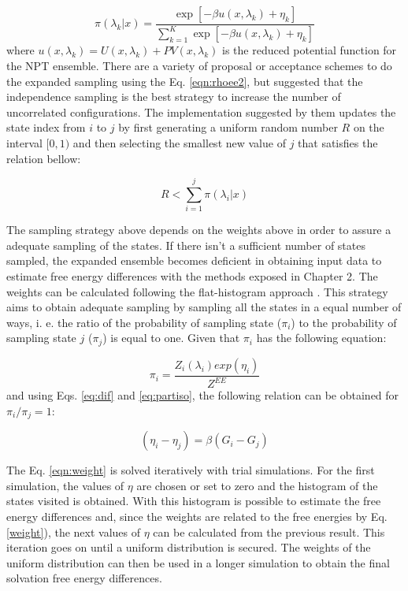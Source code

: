 \begin{equation}
\pi(\lambda_{k}|x) = \dfrac{\exp[-\beta u(x,\lambda_{k}) + \eta_{k}]}{ \sum_{k=1}^{K} \exp [- \beta u(x,\lambda_{k})+ \eta_{k}]}
\label{eqn:rhoee2}
\end{equation} 
where $u(x,\lambda_{k}) = U(x,\lambda_{k}) + PV(x,\lambda_{k})$ is the reduced potential function for the NPT ensemble. There are a variety of proposal or acceptance schemes to do the expanded sampling using the Eq. \eqref{eqn:rhoee2}, but  suggested that the independence sampling \cite{liu2002} is the best strategy to increase the number of uncorrelated configurations. The implementation suggested by them updates the state index from $i$ to $j$ by first generating a uniform random number $R$ on the interval $[0,1)$ and then selecting the smallest new value of $j$ that satisfies  the relation bellow:

\begin{equation}
R < \sum_{i=1}^{j} \pi(\lambda_{i}|x) 
\label{eqn:relee2}
\end{equation} 

The sampling strategy above depends on the weights above in order to assure a adequate sampling of the states. If there isn't a sufficient number of states sampled, the expanded ensemble becomes deficient in obtaining input data to estimate free energy differences with the methods exposed in Chapter 2. The weights can be calculated following the flat-histogram approach \cite{bernd1992,bernd1993,dayal2004}. This strategy aims to obtain adequate sampling by sampling all the states in a equal number of ways, i. e. the ratio of the probability of sampling state ($\pi_{i}$) to the probability of sampling state $j$ ($\pi_{j}$) is equal to one. Given that $\pi_{i}$ has the following equation:

\begin{equation}
\pi_{i} = \dfrac{Z_{i}(\lambda_{i}) exp(\eta_{i})}{Z^{EE}} 
\label{eqn:wei1}
\end{equation} 
and using Eqs. \ref{eq:dif} and \ref {eq:partiso}, the following relation can be obtained for $\pi_{i}/\pi_{j}=1$:

\begin{equation}
(\eta_{i} - \eta_{j}) = \beta(G_i-G_j)
\label{eqn:weight}
\end{equation}

The Eq. \eqref{eqn:weight} is solved iteratively with trial simulations. For the first simulation, the values of $\eta$ are chosen or set to zero and the histogram of the states visited is obtained. With this histogram is possible to estimate the free energy differences and, since the weights are related to the free energies by Eq. \eqref{weight}), the next values of $\eta$ can be calculated  from the previous result. This iteration goes on until a uniform distribution is secured. The weights of the uniform distribution can then  be used in a longer simulation to obtain the final solvation free energy differences.

